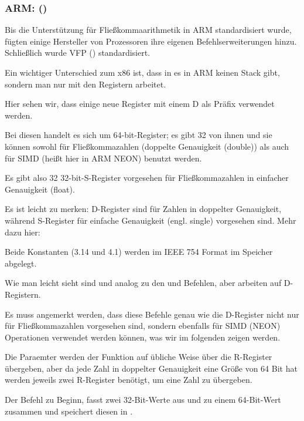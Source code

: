 \subsubsection{ARM: \OptimizingXcodeIV (\ARMMode)}
Bis die Unterstützung für Fließkommaarithmetik in ARM standardisiert wurde,
fügten einige Hersteller von Prozessoren ihre eigenen Befehlserweiterungen
hinzu. 
Schließlich wurde VFP () standardisiert.

Ein wichtiger Unterschied zum x86 ist, dass in es in ARM keinen Stack gibt,
sondern man nur mit den Registern arbeitet.




Hier sehen wir, dass einige neue Register mit einem D als Präfix verwendet
werden.

Bei diesen handelt es sich um 64-bit-Register; es gibt 32 von ihnen und sie
können sowohl für Fließkommazahlen (doppelte Genauigkeit (double)) als auch für
SIMD (heißt hier in ARM NEON) benutzt werden.

Es gibt also 32 32-bit-S-Register vorgesehen für Fließkommazahlen in einfacher
Genauigkeit (float).

Es ist leicht zu merken: D-Register sind für Zahlen in doppelter Genauigkeit,
während S-Register für einfache Genauigkeit (engl. single) vorgesehen sind.
Mehr dazu hier:

Beide Konstanten (3.14 und 4.1) werden im IEEE 754 Format im Speicher abgelegt.

Wie man leicht sieht sind  und  analog zu den  und
\MOV Befehlen, aber arbeiten auf D-Registern.

Es muss angemerkt werden, dass diese Befehle genau wie die D-Register nicht nur
für Fließkommazahlen vorgesehen sind, sondern ebenfalls für SIMD (NEON)
Operationen verwendet werden können, was wir im folgenden zeigen werden.

Die Paraemter werden der Funktion auf übliche Weise über die R-Register
übergeben, aber da jede Zahl in doppelter Genauigkeit eine Größe von 64 Bit hat
werden jeweils zwei R-Register benötigt, um eine Zahl zu übergeben.

Der Befehl  zu Beginn, fasst zwei 32-Bit-Werte aus
 und  zu einem 64-Bit-Wert zusammen und speichert diesen in
.


